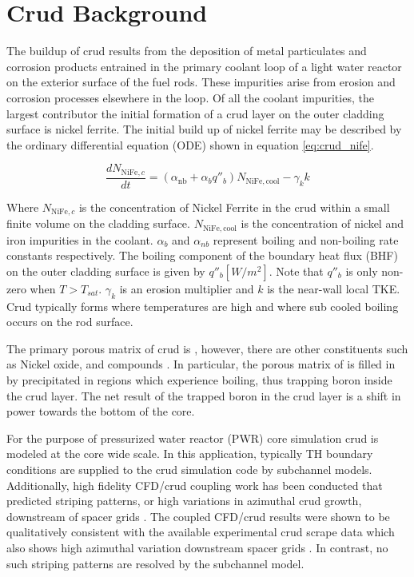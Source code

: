 \section{Crud Background}

The buildup of crud results from the deposition of metal particulates and corrosion products entrained in the primary coolant loop of a light water reactor on the exterior surface of the fuel rods.  These impurities arise from erosion and corrosion processes elsewhere in the loop.  Of all the coolant impurities, the largest contributor the initial formation of a crud layer on the outer cladding surface is nickel ferrite.  The initial build up of nickel ferrite may be described by the ordinary differential equation (ODE) shown in equation \ref{eq:crud_nife}.

\begin{equation}
\frac{d N_{\mathrm{NiFe},c}}{dt} = (\alpha_{\mathrm{nb}} + \alpha_{b}q''_{b} )N_{\mathrm{NiFe}, \mathrm{cool}} - \gamma_k k
\label{eq:crud_nife}
\end{equation}

Where $N_{\mathrm{NiFe},c}$ is the concentration of Nickel Ferrite in the crud within a small finite volume on the cladding surface.  $N_{\mathrm{NiFe}, \mathrm{cool}}$ is the concentration of nickel and iron impurities in the coolant.  $\alpha_b$ and $\alpha_{nb}$ represent boiling and non-boiling rate constants respectively.  The boiling component of the boundary heat flux (BHF) on the outer cladding surface is given by $q''_b [W/m^2]$. Note that  $q''_b$ is only non-zero when $T>T_{sat}$. $\gamma_k$ is an erosion multiplier and $k$ is the near-wall local TKE.  Crud typically forms where temperatures are high and where sub cooled boiling occurs on the rod surface.

The primary porous matrix of crud is , however, there are other constituents such as Nickel oxide,  and  compounds \cite{Henshaw2006TheCO} \cite{mongoose17}. In particular, the porous matrix of  is filled in by precipitated  in regions which experience boiling, thus trapping boron inside the crud layer.  The net result of the trapped boron in the crud layer is a shift in power towards the bottom of the core.

For the purpose of pressurized water reactor (PWR) core simulation crud is modeled at the core wide scale.  In this application, typically TH boundary conditions are supplied to the crud simulation code by subchannel models.  Additionally, high fidelity CFD/crud coupling work has been conducted that predicted striping patterns, or high variations in azimuthal crud growth, downstream of spacer grids \cite{slattery16}.  The coupled CFD/crud results were shown to be qualitatively consistent with the available experimental crud scrape data which also shows high azimuthal variation downstream spacer grids \cite{kendrick13}. In contrast, no such striping patterns are resolved by the subchannel model.

